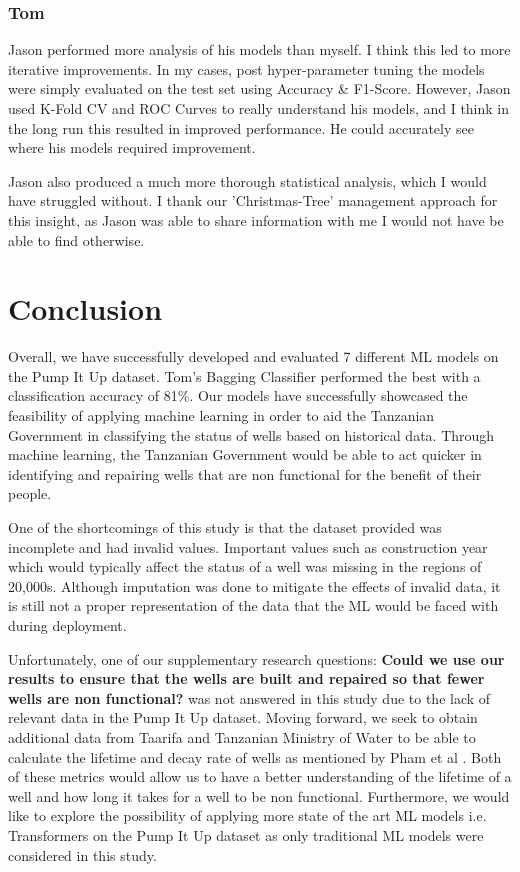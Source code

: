 \documentclass[conference]{IEEEtran}
\begin{document}
\subsubsection{Tom}

Jason performed more analysis of his models than myself. I think this led to more iterative improvements. In my cases, post hyper-parameter tuning the models were simply evaluated on the test set using Accuracy \& F1-Score. However, Jason used K-Fold CV and ROC Curves to really understand his models, and I think in the long run this resulted in improved performance. He could accurately see where his models required improvement.

Jason also produced a much more thorough statistical analysis, which I would have struggled without. I thank our 'Christmas-Tree' management approach for this insight, as Jason was able to share information with me I would not have be able to find otherwise.


\section{Conclusion}

Overall, we have successfully developed and evaluated 7 different ML models on the Pump It Up dataset. Tom's Bagging Classifier performed the best with a classification accuracy of 81\%. Our  models have successfully showcased the feasibility of applying machine learning in order to aid the Tanzanian Government in classifying the status of wells based on historical data. Through machine learning, the Tanzanian Government would be able to act quicker in identifying and repairing wells that are non functional for the benefit of their people. 

One of the shortcomings of this study is that the dataset provided was incomplete and had invalid values. Important values such as construction year which would typically affect the status of a well was missing in the regions of 20,000s. Although imputation was done to mitigate the effects of invalid data, it is still not a proper representation of the data that the ML would be faced with during deployment.

Unfortunately, one of our supplementary research questions: \textbf{Could we use our results to ensure that the wells are built and repaired so that fewer wells are non functional?} was not answered in this study due to the lack of relevant data in the Pump It Up dataset. Moving forward, we seek to obtain additional data from Taarifa and Tanzanian Ministry of Water to be able to calculate the lifetime and decay rate of wells as mentioned by Pham et al \cite{Pham_2018}. Both of these metrics would allow us to have a better understanding of the lifetime of a well and how long it takes for a well to be non functional. Furthermore, we would like to explore the possibility of applying more state of the art ML models i.e. Transformers on the Pump It Up dataset as only traditional ML models were considered in this study. 
\end{document}
